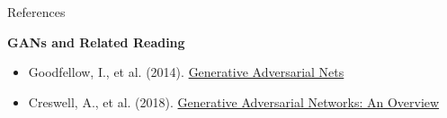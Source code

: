 \begin{frame}[allowframebreaks]{References}
\framebreak

\textbf{GANs and Related Reading}
\begin{itemize}
    \item Goodfellow, I., et al. (2014). \href{https://arxiv.org/abs/1406.2661}{Generative Adversarial Nets}
    \item Creswell, A., et al. (2018). \href{https://arxiv.org/abs/1710.07035}{Generative Adversarial Networks: An Overview}
\end{itemize}
\end{frame}